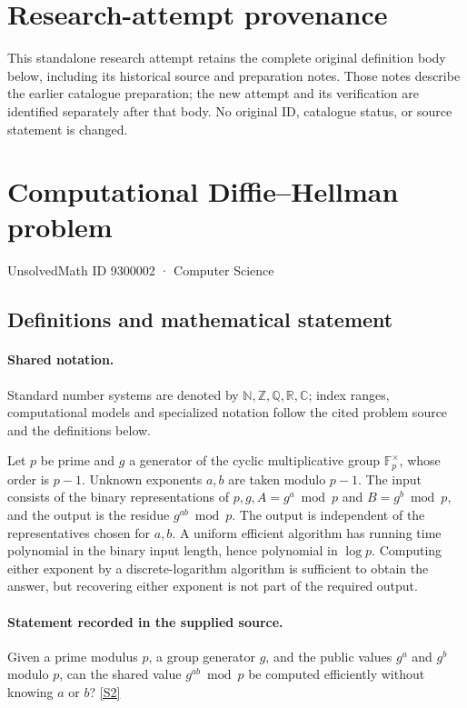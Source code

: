 \documentclass[11pt]{article}
\begin{document}
\section*{Research-attempt provenance}
This standalone research attempt retains the complete original definition body below,
including its historical source and preparation notes. Those notes describe the
earlier catalogue preparation; the new attempt and its verification are identified
separately after that body. No original ID, catalogue status, or source statement is changed.

\section{Computational Diffie–Hellman problem}\label{9300002}
{\small UnsolvedMath ID 9300002 · Computer Science}
\subsection{Definitions and mathematical statement}

\paragraph{Shared notation.}Standard number systems are denoted by $\mathbb N,\mathbb Z,\mathbb Q,\mathbb R,\mathbb C$; index ranges, computational models and specialized notation follow the cited problem source and the definitions below.


Let $p$ be prime and $g$ a generator of the cyclic multiplicative group $\mathbb{F}_p^{\times}$, whose order is $p-1$. Unknown exponents $a,b$ are taken modulo $p-1$. The input consists of the binary representations of $p,g,A=g^a\bmod p$ and $B=g^b\bmod p$, and the output is the residue $g^{ab}\bmod p$. The output is independent of the representatives chosen for $a,b$. A uniform efficient algorithm has running time polynomial in the binary input length, hence polynomial in $\log p$. Computing either exponent by a discrete-logarithm algorithm is sufficient to obtain the answer, but recovering either exponent is not part of the required output.
\paragraph{Statement recorded in the supplied source.}
Given a prime modulus $p$, a group generator $g$, and the public values $g^a$ and $g^b$ modulo $p$, can the shared value $g^{ab}\bmod p$ be computed efficiently without knowing $a$ or $b$? \href{https://unsolvedproblems.org/index_files/DiffieHellman.htm}{[S2]}
\end{document}
